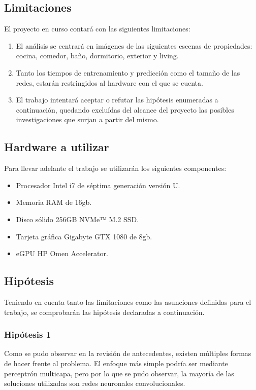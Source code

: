 \subsection{Limitaciones} \label{ssec:limitaciones}
El proyecto en curso contará con las siguientes limitaciones:
\begin{enumerate}
	\item El análisis se centrará en imágenes de las siguientes escenas de propiedades: cocina, comedor, baño, dormitorio, exterior y living.
	\item Tanto los tiempos de entrenamiento y predicción como el tamaño de las redes, estarán restringidos al hardware con el que se cuenta.
	\item El trabajo intentará aceptar o refutar las hipótesis enumeradas a continuación, quedando excluídas del alcance del proyecto las posibles investigaciones que surjan a partir del mismo.
\end{enumerate}

\subsection{Hardware a utilizar} \label{ssec:hardware}
Para llevar adelante el trabajo se utilizarán los siguientes componentes:
\begin{itemize}
	\item Procesador Intel i7 de séptima generación versión U.
	\item Memoria RAM de 16gb.
	\item Disco sólido 256GB NVMe™ M.2 SSD.
	\item Tarjeta gráfica Gigabyte GTX 1080 de 8gb.
	\item eGPU HP Omen Accelerator.
\end{itemize}

\subsection{Hipótesis}
Teniendo en cuenta tanto las limitaciones como las asunciones definidas para el trabajo, se comprobarán las hipótesis declaradas a continuación. 

\subsubsection{Hipótesis 1} \label{sssec:hipotesis1}
Como se pudo observar en la revisión de antecedentes, existen múltiples formas de hacer frente al problema. El enfoque más simple podría ser mediante perceptrón multicapa, pero por lo que se pudo observar, la mayoría de las soluciones utilizadas son redes neuronales convolucionales. 

